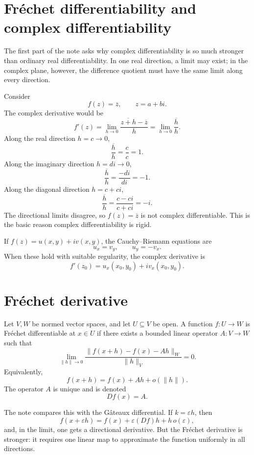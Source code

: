 
\section{Fréchet differentiability and complex differentiability}

The first part of the note asks why complex differentiability is so much stronger than ordinary real differentiability.  In one real direction, a limit may exist; in the complex plane, however, the difference quotient must have the same limit along every direction.

Consider
\[
  f(z)=\overline z,\qquad z=a+bi.
\]
The complex derivative would be
\[
  f'(z)=\lim_{h\to0}\frac{\overline{z+h}-\overline z}{h}=\lim_{h\to0}\frac{\overline h}{h}.
\]
Along the real direction \(h=c\to0\),
\[
  \frac{\overline h}{h}=\frac c c=1.
\]
Along the imaginary direction \(h=di\to0\),
\[
  \frac{\overline h}{h}=\frac{-di}{di}=-1.
\]
Along the diagonal direction \(h=c+ci\),
\[
  \frac{\overline h}{h}=\frac{c-ci}{c+ci}=-i.
\]
The directional limits disagree, so \(f(z)=\overline z\) is not complex differentiable.  This is the basic reason complex differentiability is rigid.

If \(f(z)=u(x,y)+iv(x,y)\), the Cauchy--Riemann equations are
\[
  u_x=v_y,\qquad u_y=-v_x.
\]
When these hold with suitable regularity, the complex derivative is
\[
  f'(z_0)=u_x(x_0,y_0)+iv_x(x_0,y_0).
\]

\section{Fréchet derivative}

Let \(V,W\) be normed vector spaces, and let \(U\subseteq V\) be open.  A function \(f:U\to W\) is Fréchet differentiable at \(x\in U\) if there exists a bounded linear operator \(A:V\to W\) such that
\[
  \lim_{\|h\|\to0}\frac{\|f(x+h)-f(x)-Ah\|_W}{\|h\|_V}=0.
\]
Equivalently,
\[
  f(x+h)=f(x)+Ah+o(\|h\|).
\]
The operator \(A\) is unique and is denoted
\[
  Df(x)=A.
\]

The note compares this with the Gâteaux differential.  If \(k=\varepsilon h\), then
\[
  f(x+\varepsilon h)=f(x)+\varepsilon(Df)h+h\,o(\varepsilon),
\]
and, in the limit, one gets a directional derivative.  But the Fréchet derivative is stronger: it requires one linear map to approximate the function uniformly in all directions.

